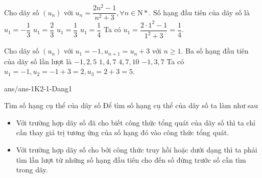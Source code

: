 \begin{ex}%
	Cho dãy số $(u_n)$ với $u_n=\dfrac{2n^2-1}{n^2+3}, \forall n \in \mathrm{N*}$. Số hạng đầu tiên của dãy số là 
	\choice
	{$ u_1=-\dfrac{1}{3}$}
	{$ u_1=\dfrac{2}{3}$}
	{$ u_1=\dfrac{1}{3}$}
	{\True $ u_1=\dfrac{1}{4}$ }
	\loigiai
	{Ta có $u_1=\dfrac{2\cdot 1^2-1}{1^2+3}=\dfrac{1}{4}$.
	}
\end{ex}
\begin{ex}%
	Cho dãy số $(u_n)$ với $u_1=-1, u_{n+1}=u_n+3$ với $n \ge 1$. Ba số hạng đầu tiên của dãy số lần lượt là 
	\choice
	{\True $-1, 2, 5$}
	{$ 1, 4, 7$}
	{$ 4,7,10$}
	{$-1,3,7$ }
	\loigiai
	{Ta có $u_1=-1, u_2=-1+3=2 ,u_3 = 2+3=5$.
	}
\end{ex}
\begin{indapan}{10}
	{ans/ans-1K2-1-Dang1}
\end{indapan}

\begin{dang}{Tìm số hạng cụ thể của dãy số}
	Để tìm số hạng cụ thể của dãy số ta làm như sau
	\begin{itemize} 
		\item Với trường hợp dãy số đã cho biết công thức tổng quát của dãy số thì ta chỉ cần thay giá trị tương ứng của số hạng đó vào công thức tổng quát.
		\item  Với trường hợp dãy số cho bởi công thức truy hồi hoặc dưới dạng thì ta phải tìm lần lượt từ những số hạng đầu tiên cho đến số đứng trước số cần tìm trong dãy.
	\end{itemize}
\end{dang}
